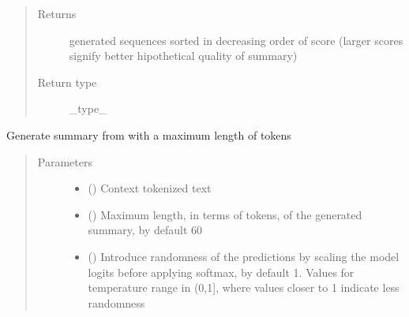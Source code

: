 \documentclass[letterpaper,10pt,english]{sphinxmanual}
\begin{document}
\begin{fulllineitems}
\begin{fulllineitems}
\begin{quote}
\begin{description}
\item[{Returns}] \leavevmode
\sphinxAtStartPar
{} generated sequences sorted in decreasing order of score (larger
scores signify better hipothetical quality of summary)

\item[{Return type}] \leavevmode
\sphinxAtStartPar
\_type\_

\end{description}\end{quote}

\end{fulllineitems}


\begin{fulllineitems}
\label{\detokenize{code:gpt2_summarizer.GPT2Summarizer.generate_sample}}
\sphinxAtStartPar
Generate summary from  with a maximum length of  tokens
\begin{quote}\begin{description}
\item[{Parameters}] \leavevmode\begin{itemize}
\item {} 
\sphinxAtStartPar
{} () \textendash{} Context tokenized text

\item {} 
\sphinxAtStartPar
{} (\sphinxstyleliteralemphasis{\sphinxupquote{, }}) \textendash{} Maximum length, in terms of tokens, of the generated summary, by default 60

\item {} 
\sphinxAtStartPar
{} (\sphinxstyleliteralemphasis{\sphinxupquote{, }}) \textendash{} Introduce randomness of the predictions by scaling the model logits before
applying softmax, by default 1. Values for temperature range in (0,1{]}, where
values closer to 1 indicate less randomness


\end{itemize}
\end{description}
\end{quote}
\end{fulllineitems}
\end{fulllineitems}
\end{document}
